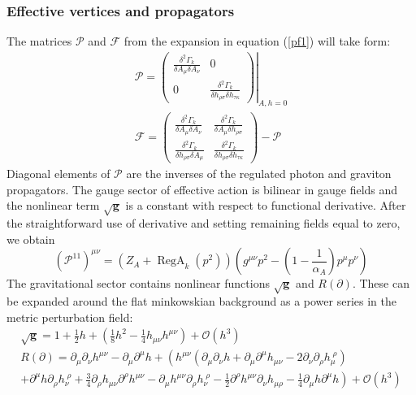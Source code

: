 \documentclass[11pt, a4paper]{article}
\begin{document}
\subsubsection{Effective vertices and propagators}
The matrices $\mathcal{P}$ and $\mathcal{F}$ from the expansion in equation (\ref{pf1}) will take form:
\begin{gather}
    \mathcal{P} = 
    \left. \begin{pmatrix}
    \frac{\delta^2 \Gamma_k}{\delta A_\mu \delta A_\nu}& 0\\
    0 & \frac{\delta^2 \Gamma_k}{\delta h_{\rho\sigma} \delta h_{\tau\kappa}}
    \end{pmatrix} \right|_{A,h=0} \\
    \mathcal{F} = 
    \begin{pmatrix}
        \frac{\delta^2 \Gamma_k}{\delta A_\mu \delta A_\nu}& \frac{\delta^2 \Gamma_k}{\delta A_\mu \delta h_{\rho\sigma}}\\
        \frac{\delta^2 \Gamma_k}{\delta h_{\rho\sigma} \delta A_\mu} & \frac{\delta^2 \Gamma_k}{\delta h_{\rho\sigma} \delta h_{\tau\kappa}}
    \end{pmatrix} - \mathcal{P}
\end{gather}
Diagonal elements of $\mathcal{P}$ are the inverses of the regulated photon and graviton propagators.
The gauge sector of effective action is bilinear in gauge fields and the nonlinear term $\sqrt{\mathbf{g}}$ is
a constant with respect to functional derivative. After the straightforward use of derivative and setting
remaining fields equal to zero, we obtain
\begin{equation}
    \left(\mathcal{P}^{1 1}\right)^{\mu\nu} = \left(Z_{A} + \operatorname{RegA}_k(p^2)\right) \left( g^{\mu\nu} p^2 - \left(1 - \frac{1}{\alpha_A}\right) p^\mu p^\nu \right)
\end{equation}
The gravitational sector contains nonlinear functions $\sqrt{\mathbf{g}}$ and $R(\partial)$.
These can be expanded around the flat minkowskian background as a power series in the metric perturbation field:
\begin{gather}
    \sqrt{\mathbf{g}} = 1 +  \frac{1}{2} h + \left( \frac{1}{8} h^2 - \frac{1}{4} h_{\mu\nu} h^{\mu\nu} \right) + \mathcal{O}(h^3) \\
    R(\partial) = \partial_\mu \partial_\nu h^{\mu\nu} - \partial_\mu \partial^\mu h + \left( h^{\mu\nu} \left(\partial_\mu \partial_\nu h + \partial_\mu \partial^\mu h_{\mu\nu} - 2 \partial_\nu \partial_\rho h_\mu^{\; \rho} \right) \phantom{\frac{1}{2}} \right. \\
    +  \left. \partial^\mu h \partial_\rho h_\nu^{\; \rho} + \frac{3}{4} \partial_\rho h_{\mu\nu} \partial^\rho h^{\mu\nu} - \partial_\mu h^{\mu\nu} \partial_\rho h_\nu^{\;\rho} - \frac{1}{2} \partial^\rho h^{\mu\nu} \partial_\nu h_{\mu\rho} - \frac{1}{4} \partial_\mu h \partial^\mu h \right) + \mathcal{O}(h^3)
\end{gather}
\end{document}
